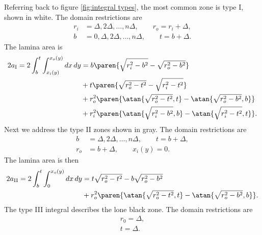 Referring back to figure \eqref{fig:integral types}, the most common zone is type I, shown in white. The domain restrictions are
%
\begin{equation}
  \begin{split}
    r_{i} &= \Delta, 2\Delta, \dots, n \Delta, \qquad r_{o} = r_{i} + \Delta, \\
    b &= 0, \Delta, 2\Delta, \dots, n \Delta, \qquad t = b + \Delta  .
  \end{split}
\end{equation}
%
The lamina area is
%
\begin{equation}
  \begin{split}
    2a_{\mathrm{I}}=2 \int_{b}^{t} \int_{x_{i}(y)}^{x_{o}(y)} dx \, dy
      &= b \paren{ \sqrt{r_{i}^{2} - b^{2}} - \sqrt{r_{o}^{2} - b^{2}} } \\
      &+ t \paren{ \sqrt{r_{o}^{2} - t^{2}} - \sqrt{r_{i}^{2} - t^{2}} } \\
      &+ r_{o}^{2} \paren{ \atan{ \sqrt{r_{o}^{2} - t^{2}}, t }
                         - \atan{ \sqrt{r_{o}^{2} - b^{2}}, b } } \\
      &+ r_{i}^{2} \paren{ \atan{ \sqrt{r_{i}^{2} - b^{2}}, b }
                         - \atan{ \sqrt{r_{i}^{2} - t^{2}}, t } }.
  \end{split}
  \label{eq:area integral I}
\end{equation}
%
Next we address the type II zones shown in gray. The domain restrictions are
%
\begin{equation}
  \begin{split}
    b &= \Delta, 2\Delta, \dots, n \Delta, \qquad t = b + \Delta, \\
    r_{o} &= b+\Delta, \qquad x_{i}(y) = 0  .
  \end{split}
\end{equation}
%
The lamina area is then
%
\begin{equation}
  \begin{split}
    2a_{\mathrm{II}}=2 \int_{b}^{t} \int_{0}^{x_{o}(y)} dx \, dy
      &= t \sqrt{r_{o}^{2} - t^{2}} - b \sqrt{r_{o}^{2} - b^{2}} \\
      &+ r_{o}^{2} \paren{ \atan{ \sqrt{r_{o}^{2} - t^{2}}, t }
                         - \atan{ \sqrt{r_{o}^{2} - b^{2}}, b } }. \\
  \end{split}
  \label{eq:area integral II}
\end{equation}
%
The type III integral describes the lone black zone. The domain restrictions are
%
\begin{equation}
  \begin{split}
    r_{0} = \Delta, \\
    t = \Delta .
  \end{split}
\end{equation}
